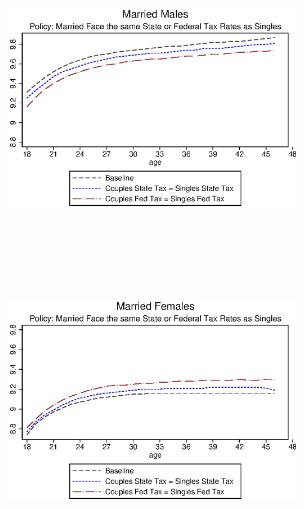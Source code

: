 \documentclass[14pt,thmsa]{article}
\begin{document}
\begin{figure}[h]
\begin{minipage}[l]{0.5\textwidth}
    \centering
  \includegraphics[width=3in,height=3in]{policy1.eps}
\end{minipage}
\begin{minipage}[l]{0.5\textwidth}
    \centering
  \includegraphics[width=3in,height=3in]{policy2.eps}
\end{minipage}
\end{figure}
\end{document}
